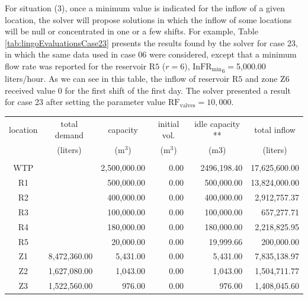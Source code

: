 \documentclass{singlecol}
\theoremstyle{TH}{
\newtheorem{lemma}{Lemma}
\newtheorem{theorem}[lemma]{Theorem}
\newtheorem{corrolary}[lemma]{Corrolary}
\newtheorem{conjecture}[lemma]{Conjecture}
\newtheorem{proposition}[lemma]{Proposition}
\newtheorem{claim}[lemma]{Claim}
\newtheorem{stheorem}[lemma]{Wrong Theorem}
\newtheorem{algorithm}{Algorithm}
}
\theoremstyle{THrm}{
\newtheorem{definition}{Definition}[section]
\newtheorem{question}{Question}[section]
\newtheorem{remark}{Remark}
\newtheorem{scheme}{Scheme}
}
\theoremstyle{THhit}{
\newtheorem{case}{Case}[section]
}
\begin{document}
For situation (3), once a minimum value is indicated for the inflow of a given location, the solver will propose solutions in which the inflow of some locations will be null or concentrated in one or a few shifts. For example, Table \ref{tab:lingoEvaluationsCase23} presents the results found by the solver for case 23, in which the same data used in case 06 were considered, except that a minimum flow rate was reported for the reservoir $\mathrm{R5}$ ($r=6$), $\mathrm{InFR_{min}}_6 = $5,000.00 liters/hour. As we can see in this table, the inflow of reservoir $\mathrm{R5}$ and zone $\mathrm{Z6}$ received value 0 for the first shift of the first day. The solver presented a result for case 23 after setting the parameter value $\mathrm{RF_{valves}}=10,000$.

\begin{table}[t]
\begin{center}
\begin{small}
	\begin{tabular}{ c r r r r r } 
		location & \multicolumn{1}{c}{total demand}      & \multicolumn{1}{c}{capacity} & \multicolumn{1}{c}{initial vol.} & \multicolumn{1}{c}{idle capacity **} & \multicolumn{1}{c}{total inflow}  \\
		      & \multicolumn{1}{c}{(liters)} & \multicolumn{1}{c}{(m$^3$)}   & \multicolumn{1}{c}{(m$^3$)}     &  \multicolumn{1}{c}{(m$3$)}   &  \multicolumn{1}{c}{(liters)}               \\
		\\
		WTP   &               & 2,500,000.00 & 0.00 &  2496,198.40 & 17,625,600.00 \\
		R1    &               &   500,000.00 & 0.00 &    500,000.00 & 13,824,000.00 \\
		R2    &               &   400,000.00 & 0.00 &    400,000.00 &  2,912,757.37 \\
		R3    &               &   100,000.00 & 0.00 &    100,000.00 &    657,277.71 \\
	    R4    &               &   180,000.00 & 0.00 &    180,000.00 &  2,218,825.95 \\
	    R5    &               &    20,000.00 & 0.00 &     19,999.66 &    200,000.00 \\
	    Z1    &  8,472,360.00 &     5,431.00 & 0.00 &      5,431.00 &  7,835,138.97 \\
	    Z2    &  1,627,080.00 &     1,043.00 & 0.00 &      1,043.00 &  1,504,711.77 \\
	    Z3    &  1,522,560.00 &       976.00 & 0.00 &        976.00 &  1,408,045.60 \\

\end{tabular}
\end{small}
\end{center}
\end{table}
\end{document}

